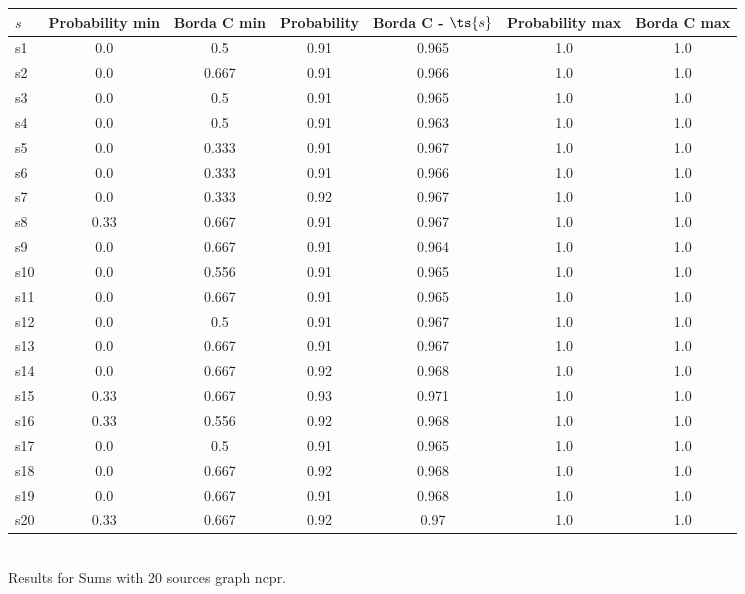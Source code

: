 \documentclass{article}
\begin{document}
\noindent\begin{tabular}{|l|c|c|c|c|c|c|}
\hline
$s$& Probability min & Borda C min & Probability & Borda C - $\ts{s}$ & Probability max & Borda C max\\
\hline
s1 &0.0 & 0.5 & 0.91 & 0.965 & 1.0 & 1.0\\
\hline
s2 &0.0 & 0.667 & 0.91 & 0.966 & 1.0 & 1.0\\
\hline
s3 &0.0 & 0.5 & 0.91 & 0.965 & 1.0 & 1.0\\
\hline
s4 &0.0 & 0.5 & 0.91 & 0.963 & 1.0 & 1.0\\
\hline
s5 &0.0 & 0.333 & 0.91 & 0.967 & 1.0 & 1.0\\
\hline
s6 &0.0 & 0.333 & 0.91 & 0.966 & 1.0 & 1.0\\
\hline
s7 &0.0 & 0.333 & 0.92 & 0.967 & 1.0 & 1.0\\
\hline
s8 &0.33 & 0.667 & 0.91 & 0.967 & 1.0 & 1.0\\
\hline
s9 &0.0 & 0.667 & 0.91 & 0.964 & 1.0 & 1.0\\
\hline
s10 &0.0 & 0.556 & 0.91 & 0.965 & 1.0 & 1.0\\
\hline
s11 &0.0 & 0.667 & 0.91 & 0.965 & 1.0 & 1.0\\
\hline
s12 &0.0 & 0.5 & 0.91 & 0.967 & 1.0 & 1.0\\
\hline
s13 &0.0 & 0.667 & 0.91 & 0.967 & 1.0 & 1.0\\
\hline
s14 &0.0 & 0.667 & 0.92 & 0.968 & 1.0 & 1.0\\
\hline
s15 &0.33 & 0.667 & 0.93 & 0.971 & 1.0 & 1.0\\
\hline
s16 &0.33 & 0.556 & 0.92 & 0.968 & 1.0 & 1.0\\
\hline
s17 &0.0 & 0.5 & 0.91 & 0.965 & 1.0 & 1.0\\
\hline
s18 &0.0 & 0.667 & 0.92 & 0.968 & 1.0 & 1.0\\
\hline
s19 &0.0 & 0.667 & 0.91 & 0.968 & 1.0 & 1.0\\
\hline
s20 &0.33 & 0.667 & 0.92 & 0.97 & 1.0 & 1.0\\
\hline
\end{tabular}\\

\noindent Results for Sums with 20 sources graph ncpr.
\end{document}
